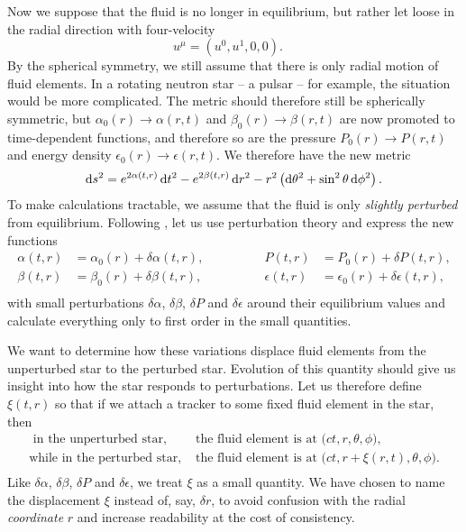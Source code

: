 Now we suppose that the fluid is no longer in equilibrium, but rather let loose in the radial direction with four-velocity
\begin{equation}
	u^\mu = (u^0, u^1, 0, 0) .
	\quad
\label{eq:nstars:velocity_unstable}
\end{equation}
By the spherical symmetry, we still assume that there is only radial motion of fluid elements.
In a rotating neutron star -- a pulsar -- for example, the situation would be more complicated.
The metric should therefore still be spherically symmetric, but $\alpha_0(r) \rightarrow \alpha(r,t)$ and $\beta_0(r) \rightarrow \beta(r,t)$ are now promoted to time-dependent functions, and therefore so are the pressure $P_0(r) \rightarrow P(r,t)$ and energy density $\epsilon_0(r) \rightarrow \epsilon(r,t)$.
We therefore have the new metric
\begin{equation}
	\mathop{}\!\mathrm{d} s^2 = e^{2 \alpha(t, r)} \mathop{}\!\mathrm{d} t^2 - e^{2 \beta(t, r)} \mathop{}\!\mathrm{d} r^2 - r^2 \left( \mathop{}\!\mathrm{d} \theta^2 + \sin^2 \theta \mathop{}\!\mathrm{d} \phi^2 \right) .
\label{eq:nstars:metric_unstable}
\end{equation}
To make calculations tractable, we assume that the fluid is only \emph{slightly perturbed} from equilibrium.
Following \cite{ref:chandrasekhar_stability}, let us use perturbation theory and express the new functions
\begin{equation}
\begin{aligned}
	\alpha   (t, r) &= \alpha_0  (r) + \delta \alpha  (t, r), & \qquad \qquad
	P        (t, r) &= P_0       (r) + \delta P       (t, r), \\
	\beta    (t, r) &= \beta_0   (r) + \delta \beta   (t, r), & \qquad \qquad
	\epsilon (t, r) &= \epsilon_0(r) + \delta \epsilon(t, r), \\
\end{aligned}
\label{eq:nstars:perturbation_expansion}
\end{equation}
with small perturbations $\delta \alpha$, $\delta \beta$, $\delta P$ and $\delta \epsilon$ around their equilibrium values and calculate everything only to first order in the small quantities.

We want to determine how these variations displace fluid elements from the unperturbed star to the perturbed star.
Evolution of this quantity should give us insight into how the star responds to perturbations.
Let us therefore define $\xi(t, r)$ so that if we attach a tracker to some fixed fluid element in the star, then
\begin{equation}
\begin{split}
	\text{      in the unperturbed star, } & \text{the fluid element is at $\big(ct,r,\theta,\phi\big)$,} \\
	\text{while in the   perturbed star, } & \text{the fluid element is at $\big(ct,r+\xi(r,t),\theta,\phi\big)$.} \\
\end{split}
\end{equation}
Like $\delta \alpha$, $\delta \beta$, $\delta P$ and $\delta \epsilon$, we treat $\xi$ as a small quantity.
We have chosen to name the displacement $\xi$ instead of, say, $\delta r$, to avoid confusion with the radial \emph{coordinate} $r$ and increase readability at the cost of consistency.

